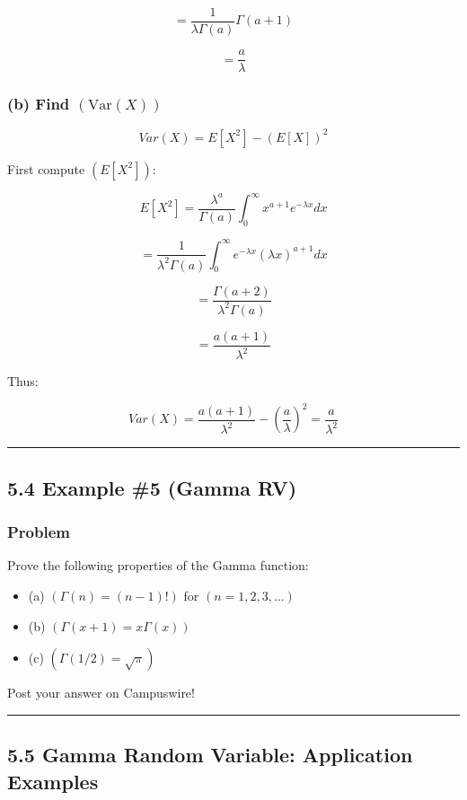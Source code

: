 \documentclass[12pt]{article}
\begin{document}
\[
=\frac{1}{\lambda\Gamma(a)}\Gamma(a+1)
\]

\[
=\frac{a}{\lambda}
\]

\subsubsection*{\textbf{(b) Find $(\text{Var}(X))$}}

\[
Var(X)=E[X^2]-(E[X])^2
\]

First compute $(E[X^2])$:

\[
E[X^2]=\frac{\lambda^a}{\Gamma(a)}\int_0^\infty x^{a+1}e^{-\lambda x}dx
\]

\[
=\frac{1}{\lambda^2\Gamma(a)}\int_0^\infty e^{-\lambda x}(\lambda x)^{a+1}dx
\]

\[
=\frac{\Gamma(a+2)}{\lambda^2\Gamma(a)}
\]

\[
=\frac{a(a+1)}{\lambda^2}
\]

Thus:

\[
Var(X)=\frac{a(a+1)}{\lambda^2}-\left(\frac{a}{\lambda}\right)^2
=\frac{a}{\lambda^2}
\]

\hrule
\vspace{1em}

\subsection*{\textbf{5.4 Example \#5 (Gamma RV)}}

\subsubsection*{\textbf{Problem}}

Prove the following properties of the Gamma function:

\begin{itemize}
    \item (a) $(\Gamma(n)=(n-1)!)$ for $(n=1,2,3,...)$
    \item (b) $(\Gamma(x+1)=x\Gamma(x))$
    \item (c) $(\Gamma(1/2)=\sqrt{\pi})$
\end{itemize}

Post your answer on Campuswire!

\hrule
\vspace{1em}

\subsection*{\textbf{5.5 Gamma Random Variable: Application Examples}}
\end{document}
